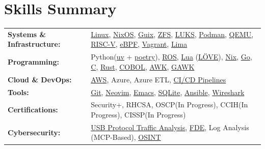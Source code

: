 \documentclass[a4paper,11pt]{article}
\begin{document}
\section{Skills Summary}
    \vspace{1pt}
	{\small
	\begin{tabularx}{\textwidth}{@{}l@{\hspace{1em}}X@{}}
	\textbf{Systems \& Infrastructure:} & \href{https://github.com/torvalds/linux}{Linux}, \href{https://nixos.org/manual/nixos/stable/}{NixOS}, \href{https://guix.gnu.org/}{Guix}, \href{https://openzfs.org/wiki/Main_Page}{ZFS}, \href{https://gitlab.com/cryptsetup/cryptsetup}{LUKS}, \href{https://podman.io/docs}{Podman}, \href{https://www.qemu.org/}{QEMU}, \href{https://riscv.org/}{RISC-V}, \href{https://ebpf.io/}{eBPF}, \href{https://developer.hashicorp.com/vagrant}{Vagrant}, \href{https://github.com/lima-vm/lima}{Lima} \\[2pt]
	\textbf{Programming:}               & Python(\href{https://docs.astral.sh/uv/}{uv} + \href{https://python-poetry.org/docs/}{poetry}), \href{https://en.wikipedia.org/wiki/Robot_Operating_System}{ROS}, \href{https://www.lua.org/}{Lua} (\href{https://love2d.org/}{LÖVE}), \href{https://nixos.org/}{Nix}, \href{https://go.dev/}{Go}, \href{https://gustedt.gitlabpages.inria.fr/modern-c/}{C}, \href{https://rust-lang.org/}{Rust}, \href{https://gnucobol.sourceforge.io/doc/gnucobol.pdf}{COBOL}, \href{http://tuxgraphics.org/~guido/scripts/awk-one-liner.html}{AWK}, \href{https://www.gnu.org/software/gawk/manual/gawk.html}{GAWK} \\[2pt]
	\textbf{Cloud \& DevOps:}           & \href{https://docs.aws.amazon.com/}{AWS}, Azure, Azure ETL, \href{https://about.gitlab.com/topics/ci-cd/cicd-pipeline/}{CI/CD Pipelines} \\[2pt]
	\textbf{Tools:}                     & \href{https://git-scm.com/docs}{Git}, \href{https://neovim.io/doc/user/}{Neovim}, \href{https://www.gnu.org/software/emacs/manual/}{Emacs}, \href{https://www.sqlite.org/docs.html}{SQLite}, \href{https://docs.ansible.com/projects/ansible/latest/index.html}{Ansible}, \href{https://www.wireshark.org/download.html}{Wireshark} \\[2pt]
	\textbf{Certifications:}            & Security+, RHCSA, OSCP(In Progress), CCIH(In Progress), CISSP(In Progress)  \\[2pt]
	\textbf{Cybersecurity:}             & \href{https://morphykuffour.github.io/linux/tshark/hacking/2025/02/20/TShark-Keylogger.html}{USB Protocol Traffic Analysis}, \href{https://security.berkeley.edu/education-awareness/enabling-full-disk-encryption}{FDE}, Log Analysis (MCP-Based), \href{https://github.com/frangelbarrera/OSINT-BIBLE}{OSINT} \\[2pt]

\end{tabularx}}
\end{document}
